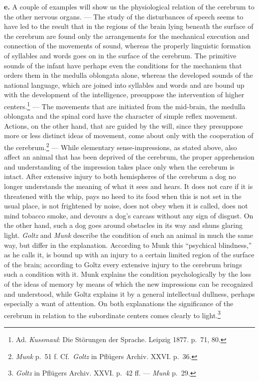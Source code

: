 \documentclass[12pt,a4paper]{book}
\newcommand{\opage}[1]{\marginnote{\footnotesize\textit{[#1]}}}
\begin{document}
\textbf{e.} A couple of examples will show us the physiological relation
of the cerebrum to the other nervous organs. --- The study of the
disturbances of speech seems to have led to the result that in the
regions of the brain lying beneath the surface of the cerebrum are found
only the arrangements for the mechanical execution and connection of the
movements of sound, whereas the properly linguistic formation of
syllables and words goes on in the surface of the cerebrum. The
primitive sounds of the infant have perhaps even the conditions for the
mechanism that orders them in the medulla oblongata alone, whereas the
developed sounds of the national language, which are joined into
syllables and words and are bound up with the development of the
intelligence, presuppose the intervention of higher
centers.\footnote{Ad. \emph{Kussmaul}: Die Störungen der Sprache.
Leipzig 1877. p.~71, 80.} --- The movements that are initiated from the
mid-brain, the medulla oblongata and the spinal cord have the character
of simple reflex movement. Actions, on the other hand, that are guided
by the will, since they presuppose more or less distinct ideas of
movement, come about only with the
cooperation of the cerebrum.\footnote{\emph{Munk} p.~51 f. Cf.\
\emph{Goltz} in Pflügers Archiv. XXVI. p.~36.} --- While elementary
sense-impressions, as stated above, also affect an animal that has been
deprived of the cerebrum, the proper apprehension and understanding of
the impression takes place only when the cerebrum is intact. After
extensive injury to both hemispheres of the cerebrum a dog no longer
understands the meaning of what it sees and hears. It does not care if
it is threatened with the whip, pays no heed to its food when this is
not set in the usual place, is not frightened by noise, does not obey
when it is called, does not mind tobacco smoke, and devours a dog's
carcass without any sign of disgust.
\opage{52}On the other hand, such a dog goes around obstacles in its way
and shuns glaring light. \emph{Goltz} and \emph{Munk} describe the
condition of such an animal in much the same way, but differ in the
explanation. According to Munk this ``psychical blindness,'' as he calls
it, is bound up with an injury to a certain limited region of the
surface of the brain; according to Goltz every extensive injury to the
cerebrum brings such a condition with it. Munk explains the condition
psychologically by the loss of the ideas of memory by means of which the
new impressions can be recognized and understood, while Goltz explains
it by a general intellectual dullness, perhaps especially a want of
attention. On both explanations the significance of the cerebrum in
relation to the subordinate centers comes
clearly to light.\footnote{\emph{Goltz} in Pflügers Archiv. XXVI.
p.~42 ff. --- \emph{Munk} p.~29.}
\end{document}
